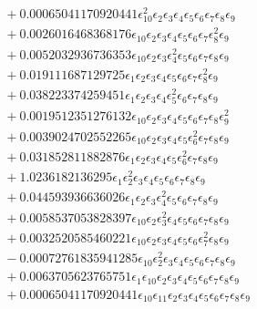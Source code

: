 \documentclass[10pt]{article}
\begin{document}
\begin{align*}
&{}  + 0.00065041170920441 \epsilon_{10}^{2} \epsilon_{2} \epsilon_{3} \epsilon_{4} \epsilon_{5} \epsilon_{6} \epsilon_{7} \epsilon_{8} \epsilon_{9} \\
&{}  + 0.0026016468368176 \epsilon_{10} \epsilon_{2} \epsilon_{3} \epsilon_{4} \epsilon_{5} \epsilon_{6} \epsilon_{7} \epsilon_{8}^{2} \epsilon_{9} \\
&{}  + 0.0052032936736353 \epsilon_{10} \epsilon_{2} \epsilon_{3} \epsilon_{4}^{2} \epsilon_{5} \epsilon_{6} \epsilon_{7} \epsilon_{8} \epsilon_{9} \\
&{}  + 0.019111687129725 \epsilon_{1} \epsilon_{2} \epsilon_{3} \epsilon_{4} \epsilon_{5} \epsilon_{6} \epsilon_{7} \epsilon_{8}^{2} \epsilon_{9} \\
&{}  + 0.038223374259451 \epsilon_{1} \epsilon_{2} \epsilon_{3} \epsilon_{4} \epsilon_{5}^{2} \epsilon_{6} \epsilon_{7} \epsilon_{8} \epsilon_{9} \\
&{}  + 0.0019512351276132 \epsilon_{10} \epsilon_{2} \epsilon_{3} \epsilon_{4} \epsilon_{5} \epsilon_{6} \epsilon_{7} \epsilon_{8} \epsilon_{9}^{2} \\
&{}  + 0.0039024702552265 \epsilon_{10} \epsilon_{2} \epsilon_{3} \epsilon_{4} \epsilon_{5} \epsilon_{6}^{2} \epsilon_{7} \epsilon_{8} \epsilon_{9} \\
&{}  + 0.031852811882876 \epsilon_{1} \epsilon_{2} \epsilon_{3} \epsilon_{4} \epsilon_{5} \epsilon_{6}^{2} \epsilon_{7} \epsilon_{8} \epsilon_{9} \\
&{}  + 1.0236182136295 \epsilon_{1} \epsilon_{2}^{2} \epsilon_{3} \epsilon_{4} \epsilon_{5} \epsilon_{6} \epsilon_{7} \epsilon_{8} \epsilon_{9} \\
&{}  + 0.044593936636026 \epsilon_{1} \epsilon_{2} \epsilon_{3} \epsilon_{4}^{2} \epsilon_{5} \epsilon_{6} \epsilon_{7} \epsilon_{8} \epsilon_{9} \\
&{}  + 0.0058537053828397 \epsilon_{10} \epsilon_{2} \epsilon_{3}^{2} \epsilon_{4} \epsilon_{5} \epsilon_{6} \epsilon_{7} \epsilon_{8} \epsilon_{9} \\
&{}  + 0.0032520585460221 \epsilon_{10} \epsilon_{2} \epsilon_{3} \epsilon_{4} \epsilon_{5} \epsilon_{6} \epsilon_{7}^{2} \epsilon_{8} \epsilon_{9} \\
&{}  - 0.00072761835941285 \epsilon_{10} \epsilon_{2}^{2} \epsilon_{3} \epsilon_{4} \epsilon_{5} \epsilon_{6} \epsilon_{7} \epsilon_{8} \epsilon_{9} \\
&{}  + 0.0063705623765751 \epsilon_{1} \epsilon_{10} \epsilon_{2} \epsilon_{3} \epsilon_{4} \epsilon_{5} \epsilon_{6} \epsilon_{7} \epsilon_{8} \epsilon_{9} \\
&{}  + 0.00065041170920441 \epsilon_{10} \epsilon_{11} \epsilon_{2} \epsilon_{3} \epsilon_{4} \epsilon_{5} \epsilon_{6} \epsilon_{7} \epsilon_{8} \epsilon_{9}
\end{align*}
\end{document}
